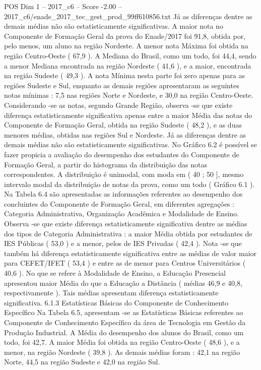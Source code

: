 \begin{textsample}{POS Dim 1 – 2017\_c6 – Score -2.00 – 2017\_c6/enade\_2017\_tec\_gest\_prod\_99ff610856.txt}
Já as diferenças dentre as demais médias não são estatisticamente significativas.
A maior nota no Componente de Formação Geral da prova do Enade/2017 foi 91,8, obtida por, pelo menos, um aluno na região Nordeste.
A menor nota Máxima foi obtida na região Centro-Oeste ( 67,9 ).
A Mediana do Brasil, como um todo, foi 44,4, sendo a menor Mediana encontrada na região Nordeste ( 41,6 ), e a maior, encontrada na região Sudeste ( 49,3 ).
A nota Mínima nesta parte foi zero apenas para as regiões Sudeste e Sul, enquanto as demais regiões apresentaram as seguintes notas mínimas : 7,5 nas regiões Norte e Nordeste, e 30,0 na região Centro-Oeste.
Considerando -se as notas, segundo Grande Região, observa -se que existe diferença estatisticamente significativa apenas entre a maior Média das notas do Componente de Formação Geral, obtida na região Sudeste ( 48,2 ), e as duas menores médias, obtidas nas regiões Sul e Nordeste.
Já as diferenças dentre as demais médias não são estatisticamente significativas.
No Gráfico 6.2 é possível se fazer propicia a avaliação do desempenho dos estudantes do Componente de Formação Geral, a partir do histograma da distribuição das notas correspondentes.
A distribuição é unimodal, com moda em ( 40 ; 50 ], mesmo intervalo modal da distribuição de notas da prova, como um todo ( Gráfico 6.1 ).
Na Tabela 6.4 são apresentadas as informações referentes ao desempenho dos concluintes do Componente de Formação Geral, em diferentes agregações : Categoria Administrativa, Organização Acadêmica e Modalidade de Ensino.
Observa -se que existe diferença estatisticamente significativa dentre as médias dos tipos de Categoria Administrativa : a maior Média obtida por estudantes de IES Públicas ( 53,0 ) e a menor, pelos de IES Privadas ( 42,4 ).
Nota -se que também há diferença estatisticamente significativa entre as médias de valor maior para CEFET/IFET ( 53,4 ) e entre as de menor para Centros Universitários ( 40,6 ).
No que se refere à Modalidade de Ensino, a Educação Presencial apresentou maior Média do que a Educação a Distância ( médias 46,9 e 40,8, respectivamente ).
Tais médias apresentam diferença estatisticamente significativa. 6.1.3 Estatísticas Básicas do Componente de Conhecimento Específico Na Tabela 6.5, apresentam -se as Estatísticas Básicas referentes ao Componente de Conhecimento Específico da área de Tecnologia em Gestão da Produção Industrial.
A Média do desempenho dos alunos do Brasil, como um todo, foi 42,7.
A maior Média foi obtida na região Centro-Oeste ( 48,6 ), e a menor, na região Nordeste ( 39,8 ).
As demais médias foram : 42,1 na região Norte, 44,5 na região Sudeste e 42,0 na região Sul.

\end{textsample}
